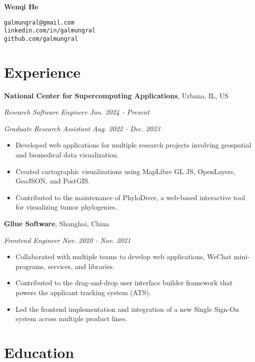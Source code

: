 \documentclass[11pt]{article}
\begin{document}
 

{\Huge\bf Wenqi He}

\vspace{10pt}
\texttt{galmungral@gmail.com}\\
\texttt{linkedin.com/in/galmungral}\\
\texttt{github.com/galmungral}\\

\section*{\sc Experience}

\vspace{1em}
\textbf{National Center for Supercomputing Applications}, Urbana, IL, US

\textit{Research Software Engineer \hfill Jan. 2024 - Present}

\textit{Graduate Research Assistant \hfill Aug. 2022 - Dec. 2023}

\begin{itemize}
\item Developed web applications for multiple research projects involving geospatial and biomedical data visualization.
\item Created cartographic visualizations using MapLibre GL JS, OpenLayers, GeoJSON, and PostGIS.
\item Contributed to the maintenance of PhyloDiver, a web-based interactive tool for visualizing tumor phylogenies.
\end{itemize}

\vspace{1em}
\textbf{Gllue Software}, Shanghai, China

\textit{Frontend Engineer \hfill Nov. 2020 - Nov. 2021}

\begin{itemize}
\item Collaborated with multiple teams to develop web applications, WeChat mini-programs, services, and libraries.
\item Contributed to the drag-and-drop user interface builder framework that powers the applicant tracking system (ATS).
\item Led the frontend implementation and integration of a new Single Sign-On system across multiple product lines.
\end{itemize}

\section*{\sc Education}
\end{document}
